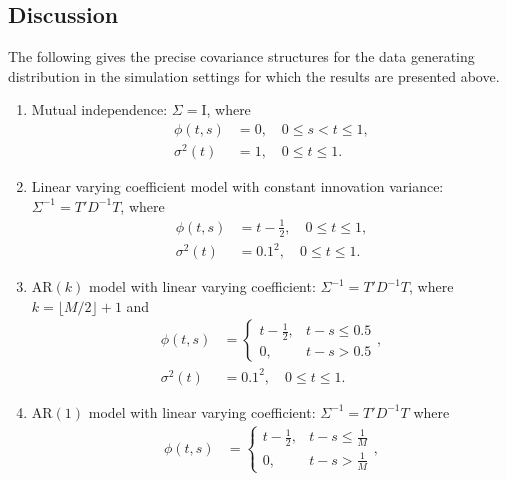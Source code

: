 \documentclass[12pt]{article}
\theoremstyle{definition}
\begin{document}
\subsection{Discussion}

The following gives the precise covariance structures for the data generating distribution in the simulation settings for which the results are presented above. 
\begin{enumerate} 
\item\label{item:cov-type-2} Mutual independence: $\Sigma = \mathrm{I}$, where 
\begin{align*}
\phi\left(t,s\right) &= 0, \quad 0 \le s < t \le 1,\\ 
\sigma^2\left(t\right) &= 1, \quad 0 \le t \le 1.
\end{align*}
\item \label{item:cov-type-2} Linear varying coefficient model with constant innovation variance: $\Sigma^{-1} = T' D^{-1} T$, where 
\begin{align*}
\phi\left(t,s\right) &= t - \frac{1}{2},  \quad 0 \le t \le 1, \\
\sigma^2\left(t\right) &= 0.1^2,  \quad 0 \le t \le 1.
\end{align*}
\item \label{item:cov-type-3} $\mbox{AR}\left(k\right)$ model with linear varying coefficient: $\Sigma^{-1} = T' D^{-1} T$, where $k = \lfloor M/2\rfloor + 1$ and 
\begin{align*}
\phi\left(t,s\right) &= \left\{\begin{array}{ll} t - \frac{1}{2}, & t - s \le 0.5\\ 
0, & t - s > 0.5\end{array}\right.,\\
\sigma^2\left(t\right) &= 0.1^2, \quad 0 \le t \le 1.
\end{align*}
\item \label{item:cov-type-4} $\mbox{AR}\left(1\right)$ model with linear varying coefficient: $\Sigma^{-1} = T' D^{-1} T$ where 
\begin{align*}
\phi\left(t,s\right) &= \left\{\begin{array}{ll} t - \frac{1}{2}, & t - s \le \frac{1}{M}\\ 0, & t - s > \frac{1}{M}\end{array}\right.,\\

\end{align*}
\end{enumerate}
\end{document}
